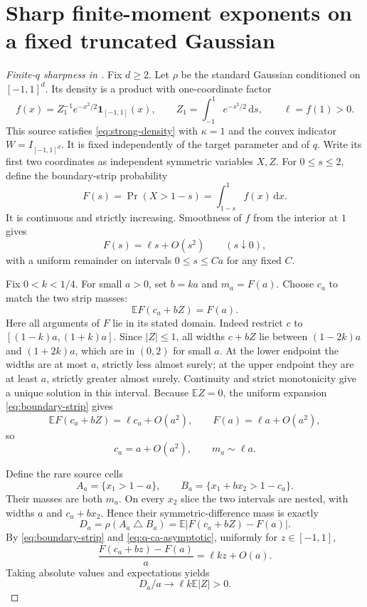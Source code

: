 \documentclass[11pt]{article}
\numberwithin{equation}{section}
\theoremstyle{remark}
\newcommand{\E}{\mathbb E}
\newcommand{\ind}{\mathbf 1}
\newcommand{\dd}{\,\mathrm d}
\begin{document}
\section{Sharp finite-moment exponents on a fixed truncated Gaussian}\label{sec:q-sharp}
\begin{proof}[Finite-$q$ sharpness in ]
Fix $d\ge2$. Let $\rho$ be the standard Gaussian conditioned on $[-1,1]^d$. Its density is a product with one-coordinate factor
\[
 f(x)=Z_1^{-1}e^{-x^2/2}\ind_{[-1,1]}(x),\qquad
 Z_1=\int_{-1}^1e^{-s^2/2}\dd s,
 \qquad \ell=f(1)>0.
\]
This source satisfies \eqref{eq:strong-density} with $\kappa=1$ and the convex indicator $W=I_{[-1,1]^d}$. It is fixed independently of the target parameter and of $q$. Write its first two coordinates as independent symmetric variables $X,Z$. For $0\le s\le2$, define the boundary-strip probability
\[
 F(s)=\Pr(X>1-s)=\int_{1-s}^1f(x)\dd x.
\]
It is continuous and strictly increasing. Smoothness of $f$ from the interior at $1$ gives
\begin{equation}\label{eq:boundary-strip}
 F(s)=\ell s+O(s^2)\qquad(s\downarrow0),
\end{equation}
with a uniform remainder on intervals $0\le s\le Ca$ for any fixed $C$.

Fix $0<k<1/4$. For small $a>0$, set $b=ka$ and $m_a=F(a)$. Choose $c_a$ to match the two strip masses:
\begin{equation}\label{eq:q-ca}
 \E F(c_a+bZ)=F(a).
\end{equation}
Here all arguments of $F$ lie in its stated domain. Indeed restrict $c$ to $[(1-k)a,(1+k)a]$. Since $|Z|\le1$, all widths $c+bZ$ lie between $(1-2k)a$ and $(1+2k)a$, which are in $(0,2)$ for small $a$. At the lower endpoint the widths are at most $a$, strictly less almost surely; at the upper endpoint they are at least $a$, strictly greater almost surely. Continuity and strict monotonicity give a unique solution in this interval. Because $\E Z=0$, the uniform expansion \eqref{eq:boundary-strip} gives
\[
 \E F(c_a+bZ)=\ell c_a+O(a^2),\qquad F(a)=\ell a+O(a^2),
\]
so
\begin{equation}\label{eq:q-ca-asymptotic}
 c_a=a+O(a^2),\qquad m_a\sim\ell a.
\end{equation}

Define the rare source cells
\[
 A_a=\{x_1>1-a\},\qquad B_a=\{x_1+b x_2>1-c_a\}.
\]
Their masses are both $m_a$. On every $x_2$ slice the two intervals are nested, with widths $a$ and $c_a+b x_2$. Hence their symmetric-difference mass is exactly
\[
 D_a=\rho(A_a\mathbin\triangle B_a)
     =\E|F(c_a+bZ)-F(a)|.
\]
By \eqref{eq:boundary-strip} and \eqref{eq:q-ca-asymptotic}, uniformly for $z\in[-1,1]$,
\[
 \frac{F(c_a+bz)-F(a)}a=\ell kz+O(a).
\]
Taking absolute values and expectations yields
\begin{equation}\label{eq:q-D-asymptotic}
 D_a/a\longrightarrow\ell k\E|Z|>0.
\end{equation}


\end{proof}
\end{document}
